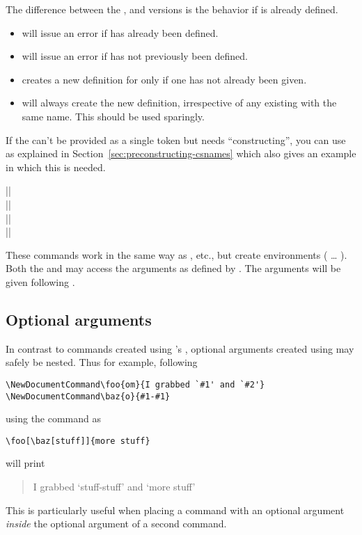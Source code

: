 \documentclass{ltxguide}
\begin{document}
The difference between the  , 
and  versions is the behavior if  is already
defined.
\begin{itemize}
 \item {} will issue an error if 
   has already been defined.
 \item {} will issue an error if 
   has not previously been defined.
 \item {} creates a new definition for
    only if one has not already been given.
 \item {} will always create the new
   definition, irrespective of any existing  with the
   same name.  This should be used sparingly.
\end{itemize}

If the  can't be provided as a single token but needs
\enquote{constructing}, you can use  as explained in
Section~\ref{sec:preconstructing-csnames} which also gives an example
in which this is needed.

\begin{decl}
  |\NewDocumentEnvironment|         \\
  |\RenewDocumentEnvironment|       \\
  |\ProvideDocumentEnvironment|     \\
  |\DeclareDocumentEnvironment|    
\end{decl}
These commands work in the same way as , etc.\@, but
create environments ( \ldots{}
). Both the  and 
may access the arguments as defined by . The arguments will be
given following .

\subsection{Optional arguments}
\label{sec:cmd:opt}

In contrast to commands created using \LaTeXe{}'s , optional
arguments created using  may safely be nested. Thus for
example, following
\begin{verbatim}
\NewDocumentCommand\foo{om}{I grabbed `#1' and `#2'}
\NewDocumentCommand\baz{o}{#1-#1}
\end{verbatim}
using the command as
\begin{verbatim}
\foo[\baz[stuff]]{more stuff}
\end{verbatim}
will print
\begin{quote}
I grabbed `stuff-stuff' and `more stuff'
\end{quote}
This is particularly useful when placing a command with an optional argument
\emph{inside} the optional argument of a second command.
\end{document}

